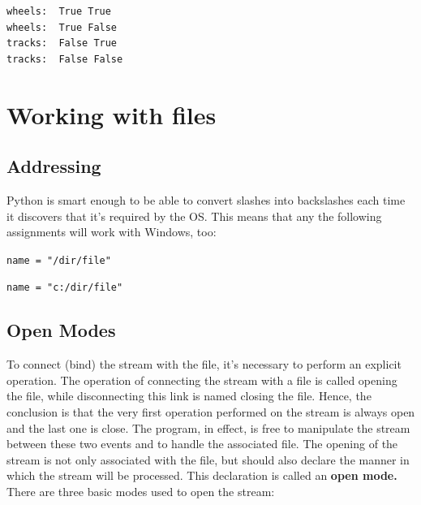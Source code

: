 \documentclass[11pt]{article}
\begin{document}
\begin{verbatim}
wheels:  True True
wheels:  True False
tracks:  False True
tracks:  False False
\end{verbatim}

\newpage

\section{Working with files}
\label{sec:org5dd8699}
\subsection{Addressing}
\label{sec:org51555da}
Python is smart enough to be able to convert slashes into backslashes
each time it discovers that it’s required by the OS. This means that
any the following assignments will work with Windows, too:

\texttt{name = "/dir/file"}

\texttt{name = "c:/dir/file"}

\subsection{Open Modes}
\label{sec:orgb036264}
To connect (bind) the stream with the file, it’s necessary to perform
an explicit operation.  The operation of connecting the stream with a
file is called opening the file, while disconnecting this link is
named closing the file.  Hence, the conclusion is that the very first
operation performed on the stream is always open and the last one is
close. The program, in effect, is free to manipulate the stream
between these two events and to handle the associated file. The
opening of the stream is not only associated with the file, but should
also declare the manner in which the stream will be processed. This
declaration is called an \textbf{open mode.} There are three basic modes used
to open the stream:
\end{document}
